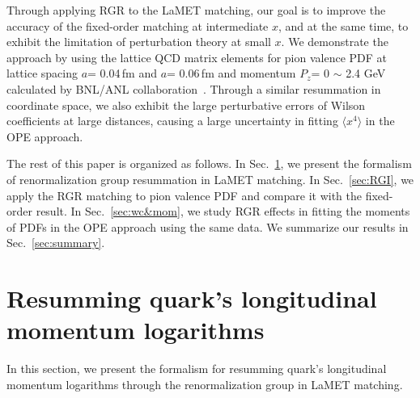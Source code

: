 \documentclass[prd,aps,twocolumn,preprintnumbers, showpacs, nofootinbib,superscriptaddress,notitlepage]{revtex4-2}
\begin{document}
Through applying RGR to the LaMET matching, our goal is to improve the accuracy of the fixed-order matching at intermediate $x$, and at the same time, to exhibit the limitation of perturbation theory at small $x$. 
We demonstrate the approach by using the lattice QCD matrix elements for pion valence PDF at lattice spacing $a$= 0.04\,fm and $a$= 0.06\,fm and momentum $P_{z}$= 0 $\sim$ 2.4 GeV calculated by BNL/ANL collaboration~\cite{Gao:2020ito,Gao:2021hxl,Gao:2021dbh}. Through
a similar resummation in coordinate space,
we also exhibit the large perturbative errors of Wilson coefficients at large distances, 
causing a large uncertainty in fitting $\langle x^4 \rangle$ in the OPE approach. 

The rest of this paper is organized as follows. In Sec.~\ref{sec:theory}, we present the formalism of renormalization group resummation in LaMET matching. In Sec.~\ref{sec:RGI}, we apply the RGR matching to pion valence PDF and compare it with the
fixed-order result. In Sec.~\ref{sec:wc&mom}, we study RGR effects in fitting the moments
of PDFs in the OPE approach using the same data. We summarize our results in Sec.~\ref{sec:summary}.

\section{Resumming quark's longitudinal momentum logarithms}\label{sec:theory}

In this section, we present the formalism for resumming quark's longitudinal momentum logarithms 
through the renormalization group in LaMET matching.
\end{document}
